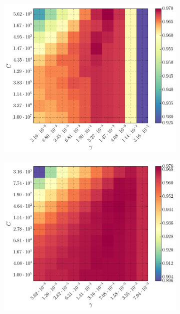 \begin{figure}[h]
\begin{subfigure}[t]{0.49\textwidth}
		\includegraphics[width=\textwidth]{figures/gridsearch/svm/superclasses/svm-superclasses-02.png}		
	\end{subfigure}
	\begin{subfigure}[t]{0.49\textwidth}
		\centering
		\includegraphics[width=\textwidth]{figures/gridsearch/svm/superclasses/svm-superclasses-03.png}				
	\end{subfigure}
	\begin{subfigure}[t]{0.49\textwidth}
		\centering

\end{subfigure}
\end{figure}
